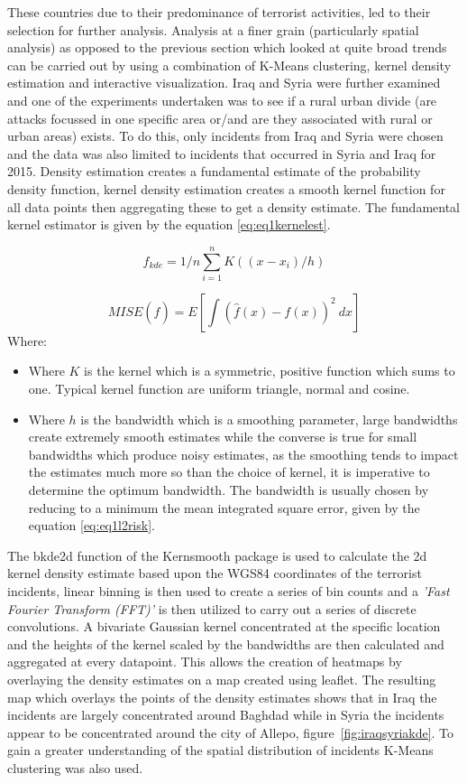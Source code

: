 These countries due to their predominance of terrorist activities, led to their selection for further analysis. Analysis at a finer grain (particularly spatial analysis) as opposed to the previous section which looked at quite broad trends can be carried out by using a combination of K-Means clustering, kernel density estimation and interactive visualization. Iraq and Syria were further examined  and one of the experiments undertaken was to see if a  rural urban divide (are attacks focussed in one specific area or/and are they associated with rural or urban areas) exists. To do this, only incidents from Iraq and Syria were chosen and the data was also limited to incidents that occurred in Syria and Iraq for 2015. 
Density estimation creates a fundamental estimate of the probability density function, kernel density estimation creates a smooth kernel function for all data points then aggregating these to get a density estimate. The fundamental kernel estimator is given by the equation \ref{eq:eq1kernelest}.

\begin{equation} \hat{f}_{kde} = 1/n \sum^n_{i=1} K((x-x_i)/h) \label{eq:eq1kernelest}  \end{equation}

\begin{equation} MISE(\hat{f})=E[\int(\hat{f}(x)-f(x))^2 \ dx]
\label{eq:eq1l2risk}  \end{equation}
Where:
\begin{itemize}
\item[]  Where $K$ is the kernel which is a symmetric, positive function which sums to one. Typical kernel function are uniform triangle, normal and cosine.
\item[]  Where $h$ is the bandwidth which is a smoothing parameter, large bandwidths create extremely smooth estimates while the  converse is true for small bandwidths which produce noisy estimates, as the smoothing tends to impact the estimates much more so than the choice of kernel, it is imperative to determine the optimum bandwidth. The bandwidth is usually chosen by reducing to a minimum the mean integrated square error, given by the equation \ref{eq:eq1l2risk}.
\end{itemize}

The bkde2d function of the Kernsmooth package is used to calculate the 2d kernel density estimate based upon the WGS84 coordinates of the terrorist incidents, linear binning is then used to create a series of bin counts and a \textit{'Fast Fourier Transform (FFT)'} is then utilized to carry out a series of discrete convolutions. A bivariate Gaussian kernel concentrated at the specific location and the heights of the kernel scaled by the bandwidths are then calculated and aggregated at every datapoint. This allows the creation of heatmaps by overlaying the density estimates on a map created using leaflet. The resulting map which overlays the points of the density estimates shows that in Iraq the incidents are largely concentrated around Baghdad while in Syria the incidents appear to be concentrated around the city of Allepo, figure~\ref{fig:iraqsyriakde}. To gain a greater understanding of the spatial distribution of incidents K-Means clustering was also used.

